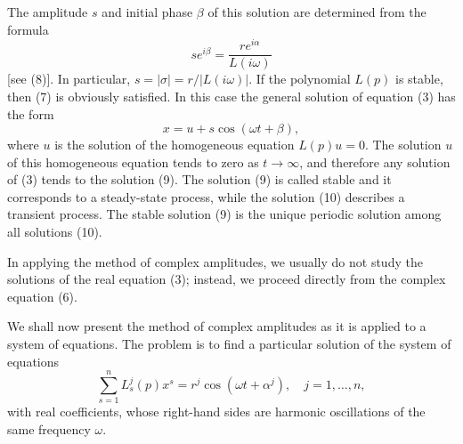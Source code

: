 \documentclass[10pt,a5paper]{book}
\theoremstyle{plain}
\theoremstyle{definition}
\theoremstyle{remark}
\begin{document}
The amplitude $s$ and initial phase $\beta$ of this solution are determined from the formula
\[
s e^{i \beta}=\frac{r e^{i \alpha}}{L(i \omega)}
\]
[see (8)]. In particular, $s=|\sigma|=r /|L(i \omega)|$. If the polynomial $L(p)$ is stable, then (7) is obviously satisfied. In this case the general solution of equation (3) has the form
\begin{equation*}
x=u+s \cos (\omega t+\beta), \tag{10}
\end{equation*}
where $u$ is the solution of the homogeneous equation $L(p) u=0$. The solution $u$ of this homogeneous equation tends to zero as $t \rightarrow \infty$, and therefore any solution of (3) tends to the solution (9). The solution (9) is called stable and it corresponds to a steady-state process, while the solution (10) describes a transient process. The stable solution (9) is the unique periodic solution among all solutions (10).

In applying the method of complex amplitudes, we usually do not study the solutions of the real equation (3); instead, we proceed directly from the complex equation (6).

We shall now present the method of complex amplitudes as it is applied to a system of equations. The problem is to find a particular solution of the system of equations
\begin{equation*}
\sum_{s=1}^{n} L_{s}^{j}(p) x^{s}=r^{j} \cos \left(\omega t+\alpha^{j}\right), \quad j=1, \ldots, n, \tag{11}
\end{equation*}
with real coefficients, whose right-hand sides are harmonic oscillations of the same frequency $\omega$.
\end{document}
